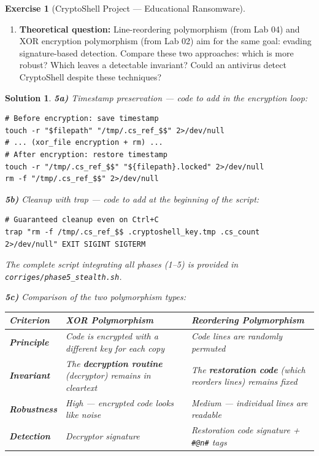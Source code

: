 \documentclass[a4paper,11pt]{article}
\theoremstyle{plain}
\newtheorem{correction}{Solution}
\theoremstyle{definition}
\newtheorem{exercice}{Exercise}
\begin{document}
\begin{exercice}[CryptoShell Project --- Educational Ransomware]
\begin{enumerate}
\item[\textbf{5c)}] \textbf{Theoretical question:} Line-reordering polymorphism (from Lab 04) and XOR encryption polymorphism (from Lab 02) aim for the same goal: evading signature-based detection. Compare these two approaches: which is more robust? Which leaves a detectable invariant? Could an antivirus detect CryptoShell despite these techniques?
\end{enumerate}

\begin{correction}

\textbf{5a)} Timestamp preservation --- code to add in the encryption loop:
\begin{lstlisting}[title=Timestamp preservation (5a)]
# Before encryption: save timestamp
touch -r "$filepath" "/tmp/.cs_ref_$$" 2>/dev/null
# ... (xor_file encryption + rm) ...
# After encryption: restore timestamp
touch -r "/tmp/.cs_ref_$$" "${filepath}.locked" 2>/dev/null
rm -f "/tmp/.cs_ref_$$" 2>/dev/null
\end{lstlisting}

\textbf{5b)} Cleanup with trap --- code to add at the beginning of the script:
\begin{lstlisting}[title=Cleanup with trap (5b)]
# Guaranteed cleanup even on Ctrl+C
trap "rm -f /tmp/.cs_ref_$$ .cryptoshell_key.tmp .cs_count 2>/dev/null" EXIT SIGINT SIGTERM
\end{lstlisting}

The complete script integrating all phases (1--5) is provided in \texttt{corriges/phase5\_stealth.sh}.

\medskip
\textbf{5c)} Comparison of the two polymorphism types:

\begin{center}
\begin{tabular}{lp{5cm}p{5cm}}
\toprule
\textbf{Criterion} & \textbf{XOR Polymorphism} & \textbf{Reordering Polymorphism} \\
\midrule
\textbf{Principle} & Code is encrypted with a different key for each copy & Code lines are randomly permuted \\
\textbf{Invariant} & The \textbf{decryption routine} (decryptor) remains in cleartext & The \textbf{restoration code} (which reorders lines) remains fixed \\
\textbf{Robustness} & High --- encrypted code looks like noise & Medium --- individual lines are readable \\
\textbf{Detection} & Decryptor signature & Restoration code signature + \texttt{\#@n\#} tags \\
\bottomrule
\end{tabular}
\end{center}


\end{correction}
\end{exercice}
\end{document}
